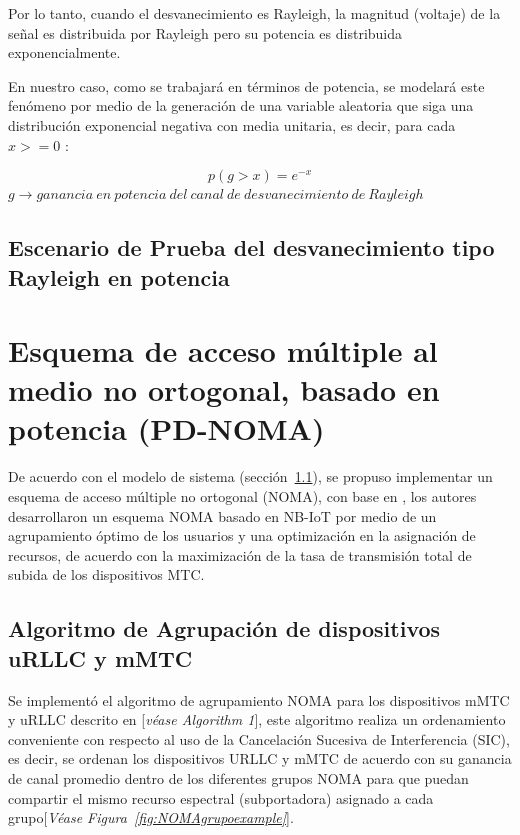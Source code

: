 Por lo tanto, cuando el desvanecimiento es Rayleigh, la magnitud (voltaje) de la señal es distribuida por Rayleigh pero su potencia es distribuida exponencialmente.\newline

En nuestro caso, como se trabajará en términos de potencia, se modelará este fenómeno por medio de la generación de una variable aleatoria que siga una distribución exponencial negativa con media unitaria, es decir, para cada $x>=0$ :

\begin{equation}
    p(g>x)=e^{-x}
\end{equation}
$g \to ganancia\ en\ potencia\ del\ canal\ de\ desvanecimiento\ de\ Rayleigh$

\subsection{Escenario de Prueba del desvanecimiento tipo Rayleigh en potencia}



\section{Esquema de acceso múltiple al medio no ortogonal, basado en potencia (PD-NOMA)}

De acuerdo con el modelo de sistema (sección~\ref{}), se propuso implementar un esquema de acceso múltiple no ortogonal (NOMA), con base en \parencite{Shahini2019}, los autores desarrollaron un esquema NOMA basado en NB-IoT por medio de un agrupamiento óptimo de los usuarios y una optimización en la asignación de recursos, de acuerdo con la maximización de la tasa de transmisión total de subida de los dispositivos MTC.\newline

\subsection{Algoritmo de Agrupación de dispositivos uRLLC  y mMTC}

Se implementó el algoritmo de agrupamiento NOMA para los dispositivos mMTC y uRLLC descrito en \parencite{Shahini2019}[\textit{véase Algorithm 1}], este algoritmo realiza un ordenamiento conveniente con respecto al uso de la Cancelación Sucesiva de Interferencia (SIC), es decir, se ordenan los dispositivos URLLC y mMTC de acuerdo con su ganancia de canal promedio dentro de los diferentes grupos NOMA para que puedan compartir el mismo recurso espectral (subportadora) asignado a cada grupo[\textit{Véase Figura~\ref{fig:NOMAgrupoexample}}].\newline

